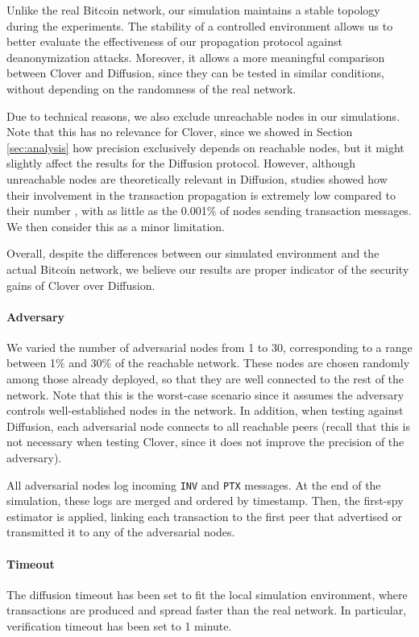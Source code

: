 \documentclass{article}
\begin{document}
	Unlike the real Bitcoin network, our simulation maintains a stable topology during the experiments.
	The stability of a controlled environment allows us to better evaluate the effectiveness of our propagation protocol against deanonymization attacks.
	Moreover, it allows a more meaningful comparison between Clover and Diffusion, since they can be tested in similar conditions, without depending on the randomness of the real network.
	
	Due to technical reasons, we also exclude unreachable nodes in our simulations.
	Note that this has no relevance for Clover, since we showed in Section \ref{sec:analysis} how precision exclusively depends on reachable nodes, but it might slightly affect the results for the Diffusion protocol.
	However, although unreachable nodes are theoretically relevant in Diffusion,
	studies showed how their involvement in the transaction propagation is extremely low compared to their number \cite{wang2017towards}, with as little as the 0.001\% of nodes sending transaction messages.
	We then consider this as a minor limitation.
	
	Overall, despite the differences between our simulated environment and the actual Bitcoin network, we believe our results are proper indicator of the security gains of Clover over Diffusion.
	
	
	\paragraph{Adversary}
	We varied the number of adversarial nodes from 1 to 30, corresponding to a range between 1\% and 30\% of the reachable network.
	These nodes are chosen randomly among those already deployed, so that they are well connected to the rest of the network.
	Note that this is the worst-case scenario since it assumes the adversary controls well-established nodes in the network.
	In addition, when testing against Diffusion, each adversarial node connects to all reachable peers (recall that this is not necessary when testing Clover, since it does not improve the precision of the adversary).
	
	All adversarial nodes log incoming \texttt{INV} and \texttt{PTX} messages.
	At the end of the simulation, these logs are merged and ordered by timestamp.
	Then, the first-spy estimator is applied, linking each transaction to the first peer that advertised or transmitted it to any of the adversarial nodes.
	
	\paragraph{Timeout}
	The diffusion timeout has been set to fit the local simulation environment, where transactions are produced and spread faster than the real network.
	In particular, verification timeout has been set to 1 minute.
	
\end{document}
